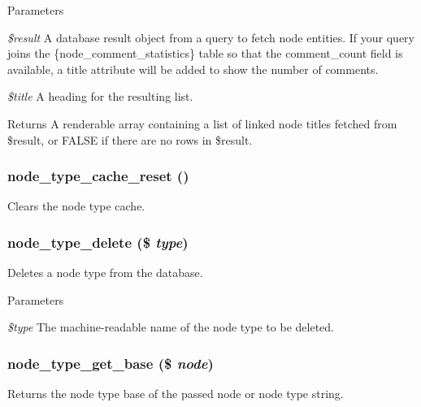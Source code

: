 \begin{DoxyParams}{Parameters}
\item[{\em \$result}]A database result object from a query to fetch node entities. If your query joins the \{node\_\-comment\_\-statistics\} table so that the comment\_\-count field is available, a title attribute will be added to show the number of comments. \item[{\em \$title}]A heading for the resulting list.\end{DoxyParams}
\begin{DoxyReturn}{Returns}
A renderable array containing a list of linked node titles fetched from \$result, or FALSE if there are no rows in \$result. 
\end{DoxyReturn}
\hypertarget{node_8module_ab31c73f858b4ebc9dbfb9915f4ea01ce}{
\subsubsection[{node\_\-type\_\-cache\_\-reset}]{\setlength{\rightskip}{0pt plus 5cm}node\_\-type\_\-cache\_\-reset ()}}
\label{node_8module_ab31c73f858b4ebc9dbfb9915f4ea01ce}
Clears the node type cache. \hypertarget{node_8module_a7fe2d244b6635513800a027053144425}{
\subsubsection[{node\_\-type\_\-delete}]{\setlength{\rightskip}{0pt plus 5cm}node\_\-type\_\-delete (\$ {\em type})}}
\label{node_8module_a7fe2d244b6635513800a027053144425}
Deletes a node type from the database.


\begin{DoxyParams}{Parameters}
\item[{\em \$type}]The machine-\/readable name of the node type to be deleted. \end{DoxyParams}
\hypertarget{node_8module_a309f62ec3eac10a30b2b2fa52da88679}{
\subsubsection[{node\_\-type\_\-get\_\-base}]{\setlength{\rightskip}{0pt plus 5cm}node\_\-type\_\-get\_\-base (\$ {\em node})}}
\label{node_8module_a309f62ec3eac10a30b2b2fa52da88679}
Returns the node type base of the passed node or node type string.


